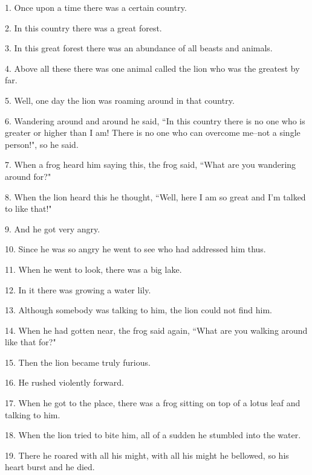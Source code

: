 \setcounter{footnote}{0}

1. Once upon a time there was a certain country.

2. In this country there was a great forest.

3. In this great forest there was an abundance of all beasts and animals.

4. Above all these there was one animal called the lion who was the greatest by
far.

5. Well, one day the lion was roaming around in that country.

6. Wandering around and around he said, ``In this country there is no one
who is greater or higher than I am! There is no one who can overcome me--not a
single person!", so he said.

7. When a frog heard him saying this, the frog said, ``What are you wandering
around for?"

8. When the lion heard this he thought, ``Well, here I am so great and
I'm talked to like that!"

9. And he got very angry.

10. Since he was so angry he went to see who had addressed him thus.

11. When he went to look, there was a big lake.

12. In it there was growing a water lily.

13. Although somebody was talking to him, the lion could not find him.

14. When he had gotten near, the frog said again, ``What are you walking
around like that for?"

15. Then the lion became truly furious.

16. He rushed violently forward.

17. When he got to the place, there was a frog sitting on top of a lotus leaf and
talking to him.

18. When the lion tried to bite him, all of a sudden he stumbled into the water.

19. There he roared with all his might, with all his might he bellowed, so his
heart burst and he died.

